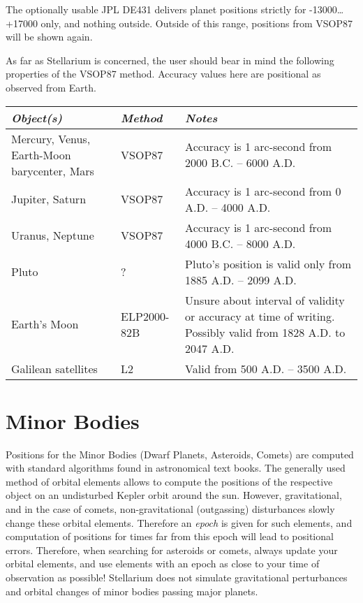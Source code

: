 The optionally usable JPL DE431 delivers planet positions strictly for
-13000\ldots+17000 only, and nothing outside. Outside of this range,
positions from VSOP87 will be shown again.

As far as Stellarium is concerned, the user should bear in mind the
following properties of the VSOP87 method. Accuracy values here are
positional as observed from Earth.

\begin{longtabu} to \textwidth {X|l|X}
\toprule
\emph{Object(s)} & \emph{Method} & \emph{Notes}\tabularnewline
\midrule
Mercury, Venus, Earth-Moon barycenter, Mars & VSOP87 & Accuracy is 1 arc-second from 2000 B.C. -- 6000 A.D. \\\midrule
Jupiter, Saturn                             & VSOP87 & Accuracy is 1 arc-second from 0 A.D. -- 4000 A.D.    \\\midrule
Uranus, Neptune                             & VSOP87 & Accuracy is 1 arc-second from 4000 B.C. -- 8000 A.D. \\\midrule
Pluto                                       & ?      & Pluto's position is valid only from 1885 A.D. -- 2099 A.D.\\\midrule
Earth's Moon                                & ELP2000-82B & Unsure about interval of validity or accuracy at time of writing. Possibly valid from 1828 A.D. to 2047 A.D.\\\midrule
Galilean satellites                         & L2     & Valid from 500 A.D. -- 3500 A.D.\\
\bottomrule
\end{longtabu}


\section{Minor Bodies}
\label{sec:Accuracy:MinorBodies}

Positions for the Minor Bodies (Dwarf Planets, Asteroids, Comets) are
computed with standard algorithms found in astronomical text
books. The generally used method of orbital elements allows to compute
the positions of the respective object on an undisturbed Kepler orbit
around the sun. However, gravitational, and in the case of comets,
non-gravitational (outgassing) disturbances slowly change these
orbital elements. Therefore an \emph{epoch} is given for such
elements, and computation of positions for times far from this epoch
will lead to positional errors. Therefore, when searching for
asteroids or comets, always update your orbital elements, and use
elements with an epoch as close to your time of observation as
possible! Stellarium does not simulate gravitational perturbances and
orbital changes of minor bodies passing major planets.

